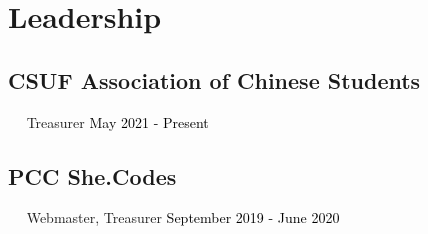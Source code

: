 \documentclass{article}
\newcommand{\resumesection}[3]{
    \subsection*{#1}
    \ 
    \ 
    \small
    \textcolor{csufgrey}{#2}
    \normalsize
    \hfill
    \textcolor{black}{#3}
    \normalsize
}
\begin{document}
\section*{Leadership}
\resumesection{CSUF Association of Chinese Students}{Treasurer}{May 2021 - Present}
\resumesection{PCC She.Codes}{Webmaster, Treasurer}{September 2019 - June 2020}
\hfill
\end{document}
